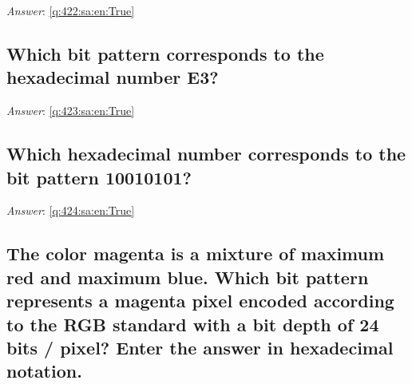 \documentclass[a4paper,11pt,oneside]{article}
\begin{document}
\begin{sloppypar}
\label{q:422:sa:en:False}

\vspace{2cm}

\noindent\makebox[\textwidth]{\hrulefill}

\vspace{1cm}

\textit{Answer}: \autoref{q:422:sa:en:True}



\subsection{Which bit pattern corresponds to the hexadecimal number E3?}

\label{q:423:sa:en:False}

\vspace{2cm}

\noindent\makebox[\textwidth]{\hrulefill}

\vspace{1cm}

\textit{Answer}: \autoref{q:423:sa:en:True}



\subsection{Which hexadecimal number corresponds to the bit pattern 10010101?}

\label{q:424:sa:en:False}

\vspace{2cm}

\noindent\makebox[\textwidth]{\hrulefill}

\vspace{1cm}

\textit{Answer}: \autoref{q:424:sa:en:True}



\subsection{The color magenta is a mixture of maximum red and maximum blue. Which bit pattern represents a magenta pixel encoded according to the RGB standard with a bit depth of 24 bits / pixel? Enter the answer in hexadecimal notation.}

\label{q:425:sa:en:False}

\vspace{2cm}

\noindent\makebox[\textwidth]{\hrulefill}


\end{sloppypar}
\end{document}
